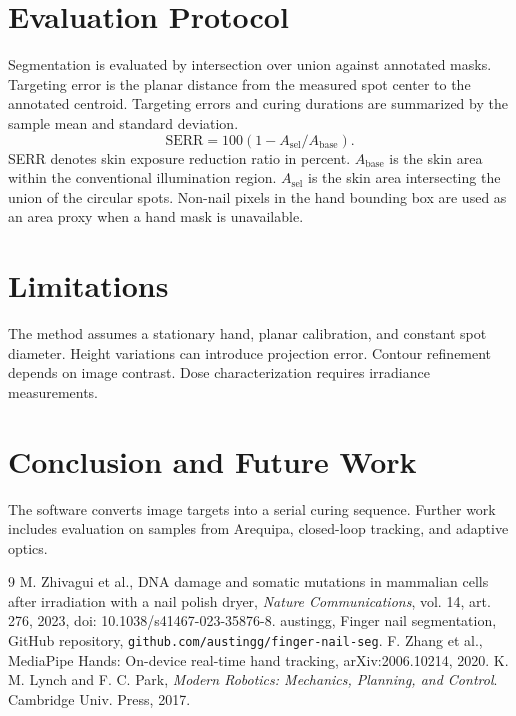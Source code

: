 \documentclass[conference]{IEEEtran}
\begin{document}
\section{Evaluation Protocol}
Segmentation is evaluated by intersection over union against annotated masks. Targeting error is the planar distance from the measured spot center to the annotated centroid. Targeting errors and curing durations are summarized by the sample mean and standard deviation.
\begin{equation}
\mathrm{SERR}=100(1-A_{\mathrm{sel}}/A_{\mathrm{base}}).
\end{equation}
SERR denotes skin exposure reduction ratio in percent. $A_{\mathrm{base}}$ is the skin area within the conventional illumination region. $A_{\mathrm{sel}}$ is the skin area intersecting the union of the circular spots. Non-nail pixels in the hand bounding box are used as an area proxy when a hand mask is unavailable.
\section{Limitations}
The method assumes a stationary hand, planar calibration, and constant spot diameter. Height variations can introduce projection error. Contour refinement depends on image contrast. Dose characterization requires irradiance measurements.
\section{Conclusion and Future Work}
The software converts image targets into a serial curing sequence. Further work includes evaluation on samples from Arequipa, closed-loop tracking, and adaptive optics.
\begin{thebibliography}{9}
 M. Zhivagui et al., DNA damage and somatic mutations in mammalian cells after irradiation with a nail polish dryer, \emph{Nature Communications}, vol. 14, art. 276, 2023, doi: 10.1038/s41467-023-35876-8.
 austingg, Finger nail segmentation, GitHub repository, \texttt{github.com/austingg/finger-nail-seg}.
 F. Zhang et al., MediaPipe Hands: On-device real-time hand tracking, arXiv:2006.10214, 2020.
 K. M. Lynch and F. C. Park, \emph{Modern Robotics: Mechanics, Planning, and Control}. Cambridge Univ. Press, 2017.
\end{thebibliography}
\end{document}
